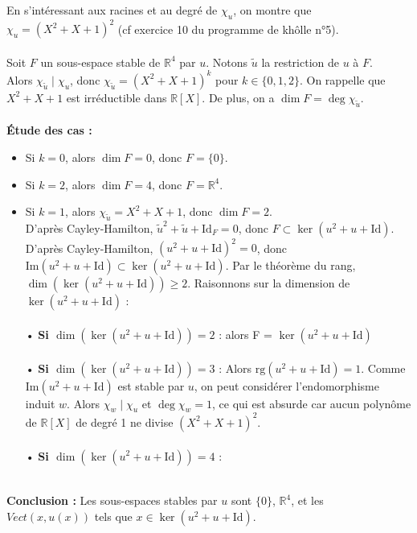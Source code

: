 \documentclass[a4paper,12pt]{article}
\begin{document}
    \begin{correctionbox}
        En s'intéressant aux racines et au degré de \( \chi_u \), on montre que \( \chi_u = (X^2 + X + 1)^2 \) (cf exercice 10 du programme de khôlle n°5). \\\\
        Soit \( F \) un sous-espace stable de \( \mathbb{R}^4 \) par \( u \). Notons \( \tilde{u} \) la restriction de \( u \) à \( F \). \\[2pt]
        Alors \( \chi_{\tilde{u}} \mid \chi_u \), donc \( \chi_{\tilde{u}} = (X^2 + X + 1)^k \) pour \( k \in \{0, 1, 2\} \). On rappelle que \( X^2 + X + 1 \) est irréductible dans \( \mathbb{R}[X] \). De plus, on a \( \dim F = \deg \chi_{\tilde{u}} \). \\\\
        \textbf{Étude des cas :} \\[2pt]
        \begin{itemize}
            \item Si \( k = 0 \), alors \( \dim F = 0 \), donc \( F = \{0\} \). \\[2pt]
            \item Si \( k = 2 \), alors \( \dim F = 4 \), donc \( F = \mathbb{R}^4 \). \\[2pt]
            \item Si \( k = 1 \), alors \( \chi_{\tilde{u}} = X^2 + X + 1 \), donc \( \dim F = 2 \). \\[2pt]
            D'après Cayley-Hamilton, \( \tilde{u}^2 + \tilde{u} + \mathrm{Id}_F = 0 \), donc \( F \subset \ker(u^2 + u + \mathrm{Id}) \). \\[2pt]
            D'après Cayley-Hamilton, \( (u^2 + u + \mathrm{Id})^2 = 0 \), donc \( \mathrm{Im}(u^2 + u + \mathrm{Id}) \subset \ker(u^2 + u + \mathrm{Id}) \). Par le théorème du rang, \( \dim(\ker(u^2 + u + \mathrm{Id})) \geq 2 \). Raisonnons sur la dimension de \( \ker(u^2 + u + \mathrm{Id}) \) :\\\\
                • \textbf{Si \( \dim(\ker(u^2 + u + \mathrm{Id})) = 2 \)} : alors F = \( \ker(u^2 + u + \mathrm{Id}) \)\\\\
                • \textbf{Si \( \dim(\ker(u^2 + u + \mathrm{Id})) = 3 \)} : Alors \( \mathrm{rg}(u^2 + u + \mathrm{Id}) = 1 \). Comme \( \mathrm{Im}(u^2 + u + \mathrm{Id}) \) est stable par \( u \), on peut considérer l'endomorphisme induit \( w \). Alors \( \chi_w \mid \chi_u \) et \( \deg \chi_w = 1 \), ce qui est absurde car aucun polynôme de \( \mathbb{R}[X] \) de degré 1 ne divise \( (X^2 + X + 1)^2 \). \\\\
                • \textbf{Si \( \dim(\ker(u^2 + u + \mathrm{Id})) = 4 \)} :\\\\
        \end{itemize}
        \textbf{Conclusion :} Les sous-espaces stables par \( u \) sont \( \{0\} \), \( \mathbb{R}^4 \), et les \(Vect(x,u(x)) \) tels que \( x \in\ker(u^2 + u + \mathrm{Id}) \).
    \end{correctionbox}
\end{document}
